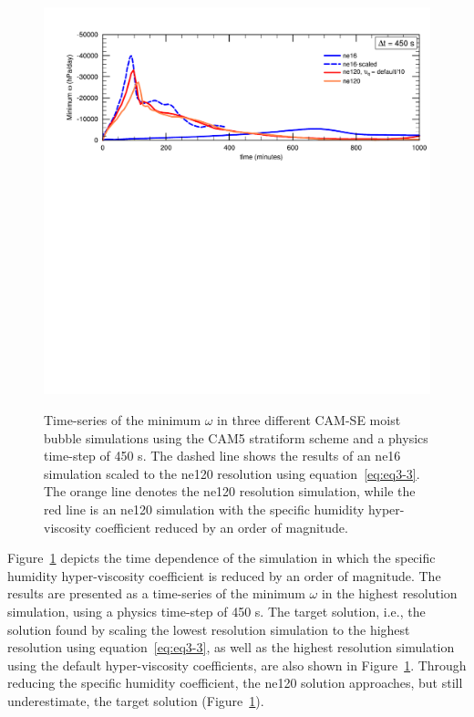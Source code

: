 \begin{figure}
\begin{center}
\noindent\includegraphics[width=35pc,angle=0]{chapter3/Figure9_crop.pdf}\\
\end{center}
\caption{Time-series of the minimum $\omega$ in three different CAM-SE moist bubble simulations using the CAM5 stratiform scheme and a physics time-step of 450 s. The dashed line shows the results of an ne16 simulation scaled to the ne120 resolution using equation~\ref{eq:eq3-3}. The orange line denotes the ne120 resolution simulation, while the red line is an ne120 simulation with the specific humidity hyper-viscosity coefficient reduced by an order of magnitude.}
\label{fig:figure3-9}
\end{figure}

Figure~\ref{fig:figure3-9} depicts the time dependence of the simulation in which the specific humidity hyper-viscosity coefficient is reduced by an order of magnitude. The results are presented as a time-series of the minimum $\omega$ in the highest resolution simulation, using a physics time-step of 450 s. The target solution, i.e., the solution found by scaling the lowest resolution simulation to the highest resolution using equation~\ref{eq:eq3-3}, as well as the highest resolution simulation using the default hyper-viscosity coefficients, are also shown in Figure~\ref{fig:figure3-9}. Through reducing the specific humidity coefficient, the ne120 solution approaches, but still underestimate, the target solution (Figure~\ref{fig:figure3-9}).

